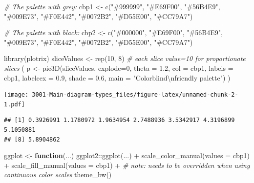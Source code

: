 \documentclass[
]{book}
\newenvironment{Shaded}{\begin{snugshade}}{\end{snugshade}}
\newcommand{\AttributeTok}[1]{\textcolor[rgb]{0.77,0.63,0.00}{#1}}
\newcommand{\CommentTok}[1]{\textcolor[rgb]{0.56,0.35,0.01}{\textit{#1}}}
\newcommand{\ControlFlowTok}[1]{\textcolor[rgb]{0.13,0.29,0.53}{\textbf{#1}}}
\newcommand{\DecValTok}[1]{\textcolor[rgb]{0.00,0.00,0.81}{#1}}
\newcommand{\FloatTok}[1]{\textcolor[rgb]{0.00,0.00,0.81}{#1}}
\newcommand{\FunctionTok}[1]{\textcolor[rgb]{0.00,0.00,0.00}{#1}}
\newcommand{\NormalTok}[1]{#1}
\newcommand{\OtherTok}[1]{\textcolor[rgb]{0.56,0.35,0.01}{#1}}
\newcommand{\SpecialCharTok}[1]{\textcolor[rgb]{0.00,0.00,0.00}{#1}}
\newcommand{\StringTok}[1]{\textcolor[rgb]{0.31,0.60,0.02}{#1}}
\begin{document}
\begin{Shaded}
\begin{Highlighting}[]
\CommentTok{\# The palette with grey:}
\NormalTok{cbp1 }\OtherTok{\textless{}{-}} \FunctionTok{c}\NormalTok{(}\StringTok{"\#999999"}\NormalTok{, }\StringTok{"\#E69F00"}\NormalTok{, }\StringTok{"\#56B4E9"}\NormalTok{, }\StringTok{"\#009E73"}\NormalTok{,}
          \StringTok{"\#F0E442"}\NormalTok{, }\StringTok{"\#0072B2"}\NormalTok{, }\StringTok{"\#D55E00"}\NormalTok{, }\StringTok{"\#CC79A7"}\NormalTok{)}

\CommentTok{\# The palette with black:}
\NormalTok{cbp2 }\OtherTok{\textless{}{-}} \FunctionTok{c}\NormalTok{(}\StringTok{"\#000000"}\NormalTok{, }\StringTok{"\#E69F00"}\NormalTok{, }\StringTok{"\#56B4E9"}\NormalTok{, }\StringTok{"\#009E73"}\NormalTok{,}
          \StringTok{"\#F0E442"}\NormalTok{, }\StringTok{"\#0072B2"}\NormalTok{, }\StringTok{"\#D55E00"}\NormalTok{, }\StringTok{"\#CC79A7"}\NormalTok{)}

\FunctionTok{library}\NormalTok{(plotrix)}
\NormalTok{sliceValues }\OtherTok{\textless{}{-}} \FunctionTok{rep}\NormalTok{(}\DecValTok{10}\NormalTok{, }\DecValTok{8}\NormalTok{) }\CommentTok{\# each slice value=10 for proportionate slices}
\NormalTok{(}
\NormalTok{  p }\OtherTok{\textless{}{-}} \FunctionTok{pie3D}\NormalTok{(sliceValues, }
      \AttributeTok{explode=}\DecValTok{0}\NormalTok{, }
      \AttributeTok{theta =} \FloatTok{1.2}\NormalTok{, }
      \AttributeTok{col =}\NormalTok{ cbp1, }
      \AttributeTok{labels =}\NormalTok{ cbp1, }
      \AttributeTok{labelcex =} \FloatTok{0.9}\NormalTok{,}
      \AttributeTok{shade =} \FloatTok{0.6}\NormalTok{,}
      \AttributeTok{main =} \StringTok{"Colorblind}\SpecialCharTok{\textbackslash{}n}\StringTok{friendly palette"}\NormalTok{)}
\NormalTok{)}
\end{Highlighting}
\end{Shaded}

\texttt{[image: 3001-Main-diagram-types\_files/figure-latex/unnamed-chunk-2-1.pdf]}

\begin{verbatim}
## [1] 0.3926991 1.1780972 1.9634954 2.7488936 3.5342917 4.3196899 5.1050881
## [8] 5.8904862
\end{verbatim}

\begin{Shaded}
\begin{Highlighting}[]
\NormalTok{ggplot }\OtherTok{\textless{}{-}} \ControlFlowTok{function}\NormalTok{(...) ggplot2}\SpecialCharTok{::}\FunctionTok{ggplot}\NormalTok{(...) }\SpecialCharTok{+} 
  \FunctionTok{scale\_color\_manual}\NormalTok{(}\AttributeTok{values =}\NormalTok{ cbp1) }\SpecialCharTok{+}
  \FunctionTok{scale\_fill\_manual}\NormalTok{(}\AttributeTok{values =}\NormalTok{ cbp1) }\SpecialCharTok{+} \CommentTok{\# note: needs to be overridden when using continuous color scales}
  \FunctionTok{theme\_bw}\NormalTok{()}
\end{Highlighting}
\end{Shaded}
\end{document}
